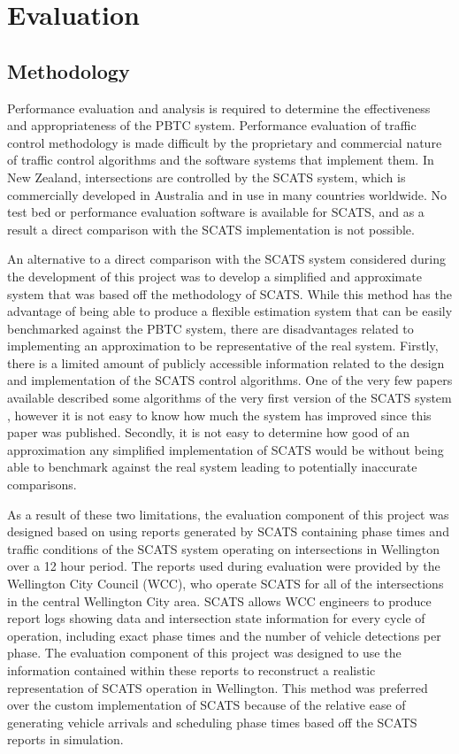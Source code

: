 \chapter{Evaluation}
\label{chapter:evaluation}

\section{Methodology}

Performance evaluation and analysis is required to determine the effectiveness and appropriateness of the PBTC system. Performance evaluation of traffic control methodology is made difficult by the proprietary and commercial nature of traffic control algorithms and the software systems that implement them. In New Zealand, intersections are controlled by the SCATS system, which is commercially developed in Australia and in use in many countries worldwide. No test bed or performance evaluation software is available for SCATS, and as a result a direct comparison with the SCATS implementation is not possible.

An alternative to a direct comparison with the SCATS system considered during the development of this project was to develop a simplified and approximate system that was based off the methodology of SCATS. While this method has the advantage of being able to produce a flexible estimation system that can be easily benchmarked against the PBTC system, there are disadvantages related to implementing an approximation to be representative of the real system. Firstly, there is a limited amount of publicly accessible information related to the design and implementation of the SCATS control algorithms. One of the very few papers available described some algorithms of the very first version of the SCATS system , however it is not easy to know how much the system has improved since this paper was published. Secondly, it is not easy to determine how good of an approximation any simplified implementation of SCATS would be without being able to benchmark against the real system leading to potentially inaccurate comparisons. 

As a result of these two limitations, the evaluation component of this project was designed based on using reports generated by SCATS containing phase times and traffic conditions of the SCATS system operating on intersections in Wellington over a 12 hour period. The reports used during evaluation were provided by the Wellington City Council (WCC), who operate SCATS for all of the intersections in the central Wellington City area. SCATS allows WCC engineers to produce report logs showing data and intersection state information for every cycle of operation, including exact phase times and the number of vehicle detections per phase. The evaluation component of this project was designed to use the information contained within these reports to reconstruct a realistic representation of SCATS operation in Wellington. This method was preferred over the custom implementation of SCATS because of the relative ease of generating vehicle arrivals and scheduling phase times based off the SCATS reports in simulation.

